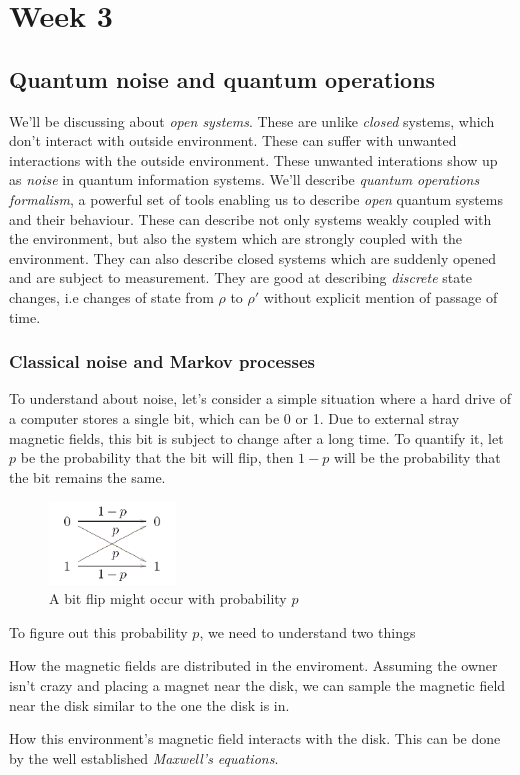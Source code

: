 \part{Week 3}
\chapter{Quantum noise and quantum operations}
We'll be discussing about \textit{open systems}. These are unlike \textit{closed} systems, which don't interact with outside environment. These can suffer with unwanted interactions with the outside environment. These unwanted interations show up as \textit{noise} in quantum information systems. We'll describe \textit{quantum operations formalism}, a powerful set of tools enabling us to describe \textit{open} quantum systems and their behaviour. These can describe not only systems weakly coupled with the environment, but also the system which are strongly coupled with the environment. They can also describe closed systems which are suddenly opened and are subject to measurement. They are good at describing \textit{discrete} state changes, i.e changes of state from $\rho$ to $\rho'$ without explicit mention of passage of time. 

\section{Classical noise and Markov processes}
To understand about noise, let's consider a simple situation where a hard drive of a computer stores a single bit, which can be 0 or 1. Due to external stray magnetic fields, this bit is subject to change after a long time. To quantify it, let $p$ be the probability that the bit will flip, then $1-p$ will be the probability that the bit remains the same.
\begin{figure}[H]
    \centering
    \includegraphics[width=0.3\textwidth]{images/classical_noise.png}
    \caption{A bit flip might occur with probability $p$}
    \label{fig:classical_noise}
\end{figure}
To figure out this probability $p$, we need to understand two things \begin{enumerate*}[label=(\alph*)]
\item How the magnetic fields are distributed in the enviroment. Assuming the owner isn't crazy and placing a magnet near the disk, we can sample the magnetic field near the disk similar to the one the disk is in.
\item How this environment's magnetic field interacts with the disk. This can be done by the well established \textit{Maxwell's equations}.
\end{enumerate*}

